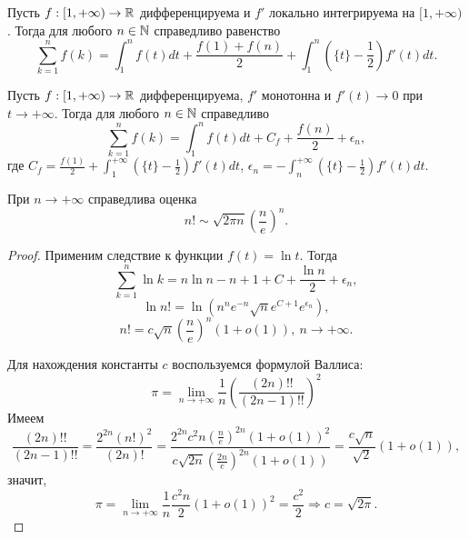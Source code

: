\begin{theorem}[Эйлер]
    Пусть $f: [1, +\infty) \to \mathbb{R}$ дифференцируема и $f'$ локально интегрируема на $[1, +\infty)$. Тогда для любого $n \in \mathbb{N}$ справедливо равенство
    \[\sum_{k = 1}^{n} f(k) = \int_{1}^{n}f(t)dt + \frac{f(1) + f(n)}{2} + \int_{1}^{n}\left(\{t\} - \frac{1}{2}\right)f'(t)dt.\]
\end{theorem}

\begin{corollary}
    Пусть $f: [1, +\infty) \to \mathbb{R}$ дифференцируема, $f'$ монотонна и $f'(t) \to 0$ при $t \to +\infty$. Тогда для любого $n \in \mathbb{N}$ справедливо
    \[\sum_{k = 1}^{n}f(k) = \int_{1}^{n}f(t)dt + C_{f} + \frac{f(n)}{2} + \epsilon_{n},\]
    где $C_{f} = \frac{f(1)}{2} + \int_{1}^{+\infty}\left(\{t\} - \frac{1}{2}\right)f'(t)dt$, $\epsilon_{n} = -\int_{n}^{+\infty}\left(\{t\} - \frac{1}{2}\right)f'(t)dt$.
\end{corollary}

\begin{example}
    При $n \to +\infty$ справедлива оценка
    \[n! \sim \sqrt{2\pi n}\left(\frac{n}{e}\right)^{n}.\]
\end{example}

\begin{proof}
    Применим следствие к функции $f(t) = \ln t$. Тогда
    \[\sum_{k = 1}^{n} \ln k = n \ln n - n + 1 + C + \frac{\ln n}{2} + \epsilon_{n},\]
    \[\ln n! = \ln(n^{n}e^{-n}\sqrt{n}e^{C + 1}e^{\epsilon_{n}}),\]
    \[n! = c\sqrt{n}\left(\frac{n}{e}\right)^{n}(1 + o(1)), \ n \to +\infty.\]

    Для нахождения константы $c$ воспользуемся формулой Валлиса:
    \[\pi = \lim_{n \to +\infty}\frac{1}{n}\left(\frac{(2n)!!}{(2n-1)!!}\right)^{2}\]
    Имеем 
    \[\frac{(2n)!!}{(2n-1)!!} = \frac{2^{2n}(n!)^{2}}{(2n)!} = \frac{2^{2n}c^{2}n\left(\frac{n}{e}\right)^{2n}(1 + o(1))^{2}}{c \sqrt{2n}\left(\frac{2n}{e}\right)^{2n}(1 + o(1))} = \frac{c\sqrt{n}}{\sqrt{2}}(1 + o(1)),\]
    значит,
    \[\pi = \lim_{n \to +\infty}\frac{1}{n}\frac{c^{2}n}{2}(1 + o(1))^{2} = \frac{c^{2}}{2} \Rightarrow c = \sqrt{2\pi}.\]
\end{proof}